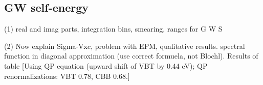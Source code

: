\documentclass[twocolumn,prb,showpacs,superscriptaddress]{revtex4}
\begin{document}
\subsection{GW self-energy}

(1) real and imag parts, integration bins, smearing, ranges for G W S

(2) Now explain Sigma-Vxc, problem with EPM, qualitative results.
spectral function in diagonal approximation (use correct formuela, not Blochl).
Results of table [Using QP equation (upward shift of VBT by 0.44 eV); QP renormalizations: VBT 0.78, CBB 0.68.]

\end{document}

